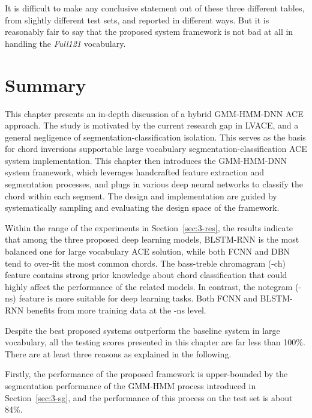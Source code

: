 It is difficult to make any conclusive statement out of these three different tables, from slightly different test sets, and reported in different ways. But it is reasonably fair to say that the proposed system framework is not bad at all in handling the \textit{Full121} vocabulary.


\section{Summary} \label{sec:3-concln}
This chapter presents an in-depth discussion of a hybrid GMM-HMM-DNN ACE approach. The study is motivated by the current research gap in LVACE, and a general negligence of segmentation-classification isolation. This serves as the basis for chord inversions supportable large vocabulary segmentation-classification ACE system implementation. This chapter then introduces the GMM-HMM-DNN system framework, which leverages handcrafted feature extraction and segmentation processes, and plugs in various deep neural networks to classify the chord within each segment. The design and implementation are guided by systematically sampling and evaluating the design space of the framework.

Within the range of the experiments in Section~\ref{sec:3-res}, the results indicate that among the three proposed deep learning models, BLSTM-RNN is the most balanced one for large vocabulary ACE solution, while both FCNN and DBN tend to over-fit the most common chords. The bass-treble chromagram (-ch) feature contains strong prior knowledge about chord classification that could highly affect the performance of the related models. In contrast, the notegram (-ns) feature is more suitable for deep learning tasks. Both FCNN and BLSTM-RNN benefits from more training data at the -ns level.

Despite the best proposed systems outperform the baseline system in large vocabulary, all the testing scores presented in this chapter are far less than 100\%. There are at least three reasons as explained in the following.



Firstly, the performance of the proposed framework is upper-bounded by the segmentation performance of the GMM-HMM process introduced in Section~\ref{sec:3-sg}, and the performance of this process on the test set is about 84\%.

